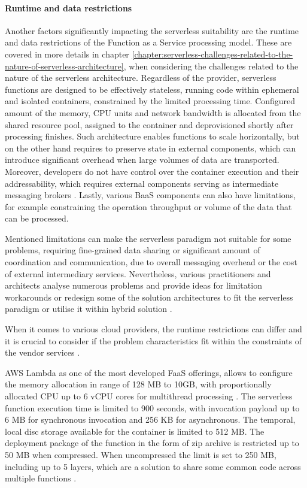 \paragraph{Runtime and data restrictions}

Another factors significantly impacting the serverless suitability are the runtime and data restrictions of the Function as a Service processing model. These are covered in more details in chapter \ref{chapter:serverless-challenges-related-to-the-nature-of-serverless-architecture}, when considering the challenges related to the nature of the serverless architecture.
Regardless of the provider, serverless functions are designed to be effectively stateless, running code within ephemeral and isolated containers, constrained by the limited processing time. Configured amount of the memory, CPU units and network bandwidth is allocated from the shared resource pool, assigned to the container and deprovisioned shortly after processing finishes.
Such architecture enables functions to scale horizontally, but on the other hand requires to preserve state in external components, which can introduce significant overhead when large volumes of data are transported.
Moreover, developers do not have control over the container execution and their addressability, which requires external components serving as intermediate messaging brokers \cite{MartinFowlerServerless}. Lastly, various BaaS components can also have limitations, for example constraining the operation throughput or volume of the data that can be processed.

Mentioned limitations can make the serverless paradigm not suitable for some problems, requiring fine-grained data sharing or significant amount of coordination and communication, due to overall messaging overhead or the cost of external intermediary services.
Nevertheless, various practitioners and architects analyse numerous problems and provide ideas for limitation workarounds or redesign some of the solution architectures to fit the serverless paradigm or utilise it within hybrid solution \cite{BerkeleyServerless}.

When it comes to various cloud providers, the runtime restrictions can differ and it is crucial to consider if the problem characteristics fit within the constraints of the vendor services \cite{LeveragingServerlessCloudComputingArchitectures}.

AWS Lambda \cite{AWSLambdaQuotas} as one of the most developed FaaS offerings, allows to configure the memory allocation in range of 128 MB to 10GB, with proportionally allocated CPU up to 6 vCPU cores for multithread processing \cite{AWSLambdaRAMandCPU}.
The serverless function execution time is limited to 900 seconds, with invocation payload up to 6 MB for synchronous invocation and 256 KB for asynchronous.
The temporal, local disc storage available for the container is limited to 512 MB.
The deployment package of the function in the form of zip archive is restricted up to 50 MB when compressed. When uncompressed the limit is set to 250 MB, including up to 5 layers, which are a solution to share some common code across multiple functions \cite{EvaluationOfServerlessApplicationProgrammingModel}.

